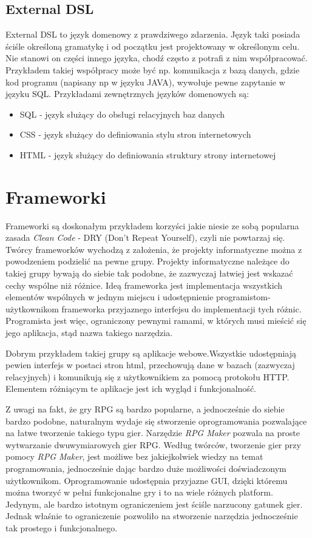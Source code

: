 \documentclass[openright]{xmgr}
\begin{document}
\subsection{External DSL}

External DSL to język domenowy z prawdziwego zdarzenia. Język taki posiada ściśle określoną gramatykę i od początku jest projektowany w określonym celu. Nie stanowi on części innego języka, chodź często z potrafi z nim współpracować. Przykładem takiej współpracy może być np. komunikacja z bazą danych, gdzie kod programu (napisany np w języku JAVA), wywołuje pewne zapytanie w języku SQL. Przykładami zewnętrznych języków domenowych są:
\begin{itemize}
	\item SQL - język służący do obsługi relacyjnych baz danych
	\item CSS - język służący do definiowania stylu stron internetowych 
	\item HTML - język służący do definiowania struktury strony internetowej
\end{itemize}

\section{Frameworki}

Frameworki są doskonałym przykładem korzyści jakie niesie ze sobą popularna zasada \textit{Clean Code} \cite{CleanCode:2005} - DRY (Don't Repeat Yourself), czyli nie powtarzaj się. 
Twórcy frameworków  wychodzą z założenia, że projekty informatyczne można z powodzeniem podzielić na pewne grupy. Projekty informatyczne należące do takiej grupy bywają do siebie tak podobne, że zazwyczaj łatwiej jest wskazać cechy wspólne niż różnice. Ideą frameworka jest implementacja wszystkich elementów wspólnych w jednym miejscu i udostępnienie programistom-użytkownikom frameworka przyjaznego interfejsu do implementacji tych różnic. Programista jest więc, ograniczony pewnymi ramami, w których musi mieścić się jego aplikacja, stąd nazwa takiego narzędzia.

Dobrym przykładem takiej grupy są aplikacje webowe.Wszystkie udostępniają pewien interfejs w postaci stron html, przechowują dane w bazach (zazwyczaj relacyjnych) i komunikują się z użytkownikiem za pomocą protokołu HTTP. Elementem różniącym te aplikacje jest ich wygląd i funkcjonalność. 

Z uwagi na fakt, że gry RPG są bardzo popularne, a jednocześnie do siebie bardzo podobne, naturalnym wydaje się stworzenie oprogramowania pozwalające na łatwe tworzenie takiego typu gier. Narzędzie \textit{RPG Maker} \cite{RPGMaker:2017:Doc} pozwala na proste wytwarzanie dwuwymiarowych gier RPG. Według twórców, tworzenie gier przy pomocy \textit{RPG Maker}, jest możliwe bez jakiejkolwiek wiedzy na temat programowania, jednocześnie dając bardzo duże możliwości doświadczonym użytkownikom. Oprogramowanie udostępnia przyjazne GUI, dzięki któremu można tworzyć w pełni funkcjonalne gry i to na wiele różnych platform. Jedynym, ale bardzo istotnym ograniczeniem jest ściśle narzucony gatunek gier. Jednak właśnie to ograniczenie pozwoliło na stworzenie narzędzia jednocześnie tak prostego i funkcjonalnego. 
\end{document}
